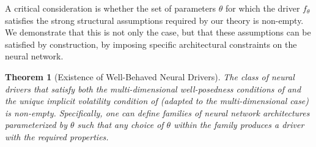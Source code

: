 \documentclass[qian]{imsart}
\theoremstyle{plain}
\newtheorem{theorem}{Theorem}[section]
\theoremstyle{definition}
\begin{document}
A critical consideration is whether the set of parameters $\theta$ for which the driver $f_\theta$ satisfies the strong structural assumptions required by our theory is non-empty. We demonstrate that this is not only the case, but that these assumptions can be satisfied by construction, by imposing specific architectural constraints on the neural network.

\begin{theorem}[Existence of Well-Behaved Neural Drivers]
\label{thm:existence_of_theta}
The class of neural drivers that satisfy both the multi-dimensional well-posedness conditions of  and the unique implicit volatility condition of  (adapted to the multi-dimensional case) is non-empty. Specifically, one can define families of neural network architectures parameterized by $\theta$ such that any choice of $\theta$ within the family produces a driver with the required properties.
\end{theorem}
\end{document}
